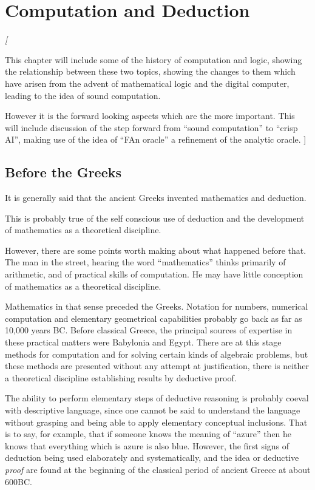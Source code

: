 
\chapter{Computation and Deduction}\label{ComputationAndDeduction}

{\it[

This chapter will include some of the history of computation and logic,
showing the relationship between these two topics, showing the
changes to them which have arisen from the advent of mathematical
logic and the digital computer, leading to the idea of sound
computation. 

However it is the forward looking aspects which are the more important.
This will include discussion of the step forward from ``sound
computation'' to ``crisp AI'', making use of the idea of ``FAn
oracle'' a refinement of the analytic oracle.
]}

\section{Before the Greeks}

It is generally said that the ancient Greeks invented mathematics and
deduction.

This is probably true of the self conscious use of deduction and the
development of mathematics as a theoretical discipline.

However, there are some points worth making about what happened before
that.
The man in the street, hearing the word ``mathematics'' thinks
primarily of arithmetic, and of practical skills of computation.
He may have little conception of mathematics as a theoretical
discipline.

Mathematics in that sense preceded the Greeks.
Notation for numbers, numerical computation and elementary
geometrical capabilities probably go back as far as 10,000
years BC.
Before classical Greece, the principal sources of expertise in these
practical matters were Babylonia and Egypt.
There are at this stage methods for computation and for solving
certain kinds of algebraic problems, but these methods are presented
without any attempt at justification, there is neither a theoretical
discipline establishing results by deductive proof.

The ability to perform elementary steps of deductive reasoning is
probably coeval with descriptive language, since one cannot be said to
understand the language without grasping and being able to apply
elementary conceptual inclusions.
That is to say, for example, that if someone knows the meaning of
``azure'' then he knows that everything which is azure is also blue.
However, the first signs of deduction being used elaborately and
systematically, and the idea or deductive \emph{proof} are found at
the beginning of the classical period of ancient Greece at about 600BC.

